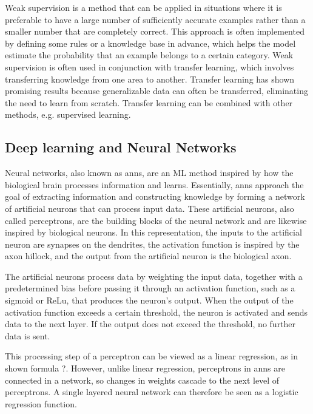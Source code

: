         Weak supervision is a method that can be applied in situations where it is preferable to have a large number of sufficiently accurate examples rather than a smaller number that are completely correct. This approach is often implemented by defining some rules or a knowledge base in advance, which helps the model estimate the probability that an example belongs to a certain category. Weak supervision is often used in conjunction with transfer learning, which involves transferring knowledge from one area to another. Transfer learning has shown promising results because generalizable data can often be transferred, eliminating the need to learn from scratch. Transfer learning can be combined with other methods, e.g. supervised learning.
    
    \subsection{Deep learning and Neural Networks} \label{sec:2_background_theory_deep_learning_and_neural_networks}
    Neural networks, also known as \glspl{ann}, are an ML method inspired by how the biological brain processes information and learns. Essentially, \glspl{ann} approach the goal of extracting information and constructing knowledge by forming a network of artificial neurons that can process input data. These artificial neurons, also called perceptrons, are the building blocks of the neural network and are likewise inspired by biological neurons. In this representation, the inputs to the artificial neuron are synapses on the dendrites, the activation function is inspired by the axon hillock, and the output from the artificial neuron is the biological axon.
    
    The artificial neurons process data by weighting the input data, together with a predetermined bias before passing it through an activation function, such as a sigmoid or ReLu, that produces the neuron's output. When the output of the activation function exceeds a certain threshold, the neuron is activated and sends data to the next layer. If the output does not exceed the threshold, no further data is sent.
    
    This processing step of a perceptron can be viewed as a linear regression, as in shown formula ?. However, unlike linear regression, perceptrons in \glspl{ann} are connected in a network, so changes in weights cascade to the next level of perceptrons. A single layered neural network can therefore be seen as a logistic regression function.
    
